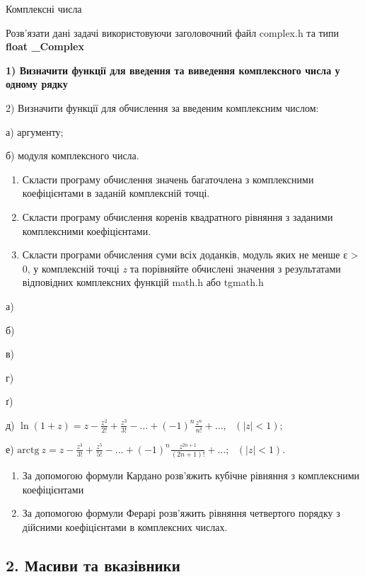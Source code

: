 \documentclass[]{article}
\begin{document}
Комплексні числа

\protect\hypertarget{_Hlk63616136}{}{}Розв'язати дані задачі
використовуючи заголовочний файл complex.h та типи \textbf{float
\_Complex}

\textbf{1) Визначити функції для введення та виведення комплексного
числа у одному рядку}

2) Визначити функції для обчислення за введеним комплексним числом:

а) аргументу;

б) модуля комплексного числа.

\begin{enumerate}
\def\labelenumi{\arabic{enumi})}
\item
  Скласти програму обчислення значень багаточлена з комплексними
  коефіцієнтами в заданій комплексній точці.
\item
  Скласти програму обчислення коренів квадратного рівняння з заданими
  комплексними коефіцієнтами.
\item
  Скласти програми обчислення суми всіх доданків, модуль яких не менше ε
  \textgreater{} 0, у комплексній точці \emph{z} та порівняйте обчислені
  значення з результатами відповідних комплексних функцій math.h або
  tgmath.h
\end{enumerate}

а)

б)

в)

г)

ґ)

д)
\(\ln(1 + z) = z - \frac{z^{2}}{2!} + \frac{z^{3}}{3!} - \ldots + ( - 1)^{n}\frac{z^{n}}{n!} + \ldots,\mathrm{\text{\ \ \ \ \ }}(\left| z \right| < 1);\)

е)
\(\mathrm{\text{arctg}}\mathrm{\ }z = z - \frac{z^{3}}{3!} + \frac{z^{5}}{5!} - \ldots + ( - 1)^{n}\frac{z^{2n + 1}}{\left( 2n + 1 \right)!} + \ldots;\mathrm{\text{\ \ \ }}\left( \left| z \right| < 1 \right).\)

\begin{enumerate}
\def\labelenumi{\arabic{enumi})}
\item
  За допомогою формули Кардано розв'яжить кубічне рівняння з
  комплексними коефіцієнтами
\item
  За допомогою формули Ферарі розв'яжить рівняння четвертого порядку з
  дійсними коефіцієнтами в комплексних числах.
\end{enumerate}

\subsection{ 2. Масиви та
вказівники}\label{ux43cux430ux441ux438ux432ux438-ux442ux430-ux432ux43aux430ux437ux456ux432ux43dux438ux43aux438}
\end{document}
